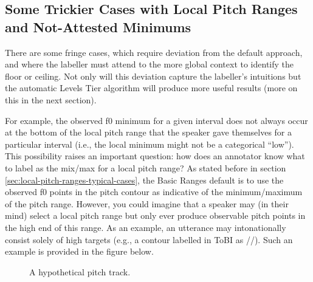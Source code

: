 \documentclass[11pt, twoside]{memoir}
\def\textlabel#1{{\relsize{-.5}\fontspec[Mapping=tex-text]{Roboto Mono}{#1}}}
\begin{document}
\subsection{Some Trickier Cases with Local Pitch Ranges and Not-Attested Minimums}\label{sec:some-trickier-cases-with-local-pitch-ranges}

There are some fringe cases, which require deviation from the default approach, and where the labeller must attend to the more global context to identify the floor or ceiling. Not only will this deviation capture the labeller’s intuitions but the automatic Levels Tier algorithm will produce more useful results (more on this in the next section).

For example, the observed f0 minimum for a given interval does not always occur at the bottom of the local pitch range that the speaker gave themselves for a particular interval (i.e., the local minimum might not be a categorical “low”). This possibility raises an important question: how does an annotator know what to label as the mix\slash max for a local pitch range? As stated before in section \ref{sec:local-pitch-ranges-typical-cases}, the Basic Ranges default is to use the observed f0 points in the pitch contour as indicative of the minimum\slash maximum of the pitch range. However, you could imagine that a speaker may (in their mind) select a local pitch range but only ever produce observable pitch points in the high end of this range. As an example, an utterance may intonationally consist solely of high targets (e.g., a contour labelled in ToBI as /\textlabel{H* H* H-H\%}/). Such an example is provided in the figure below.

\begin{figure}[H]
\centering
{}
\caption{A hypothetical pitch track.%
\label{fig:ranges-what-if3 Ranges Adv}%
}
\end{figure}
\end{document}
